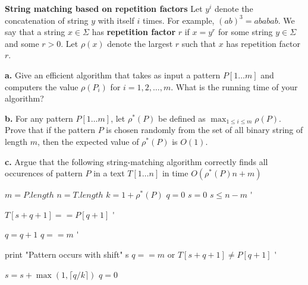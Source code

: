 \textbf{String matching based on repetition factors}
Let $y^i$ denote the concatenation of string $y$ with itself $i$ times. For example,
$(ab)^3 = ababab$. We say that a string $x\in \Sigma$ has \textbf{repetition factor}
$r$ if $x = y^r$ for some string $y\in \Sigma$ and some $r > 0$. Let $\rho(x)$ denote 
the largest $r$ such that $x$ has repetition factor $r$.

\textbf{a.} Give an efficient algorithm that takes as input a pattern $P[1\ldots m]$ and
computers the value $\rho(P_i)$ for $i = 1,2,\ldots,m$. What is the running time of your 
algorithm?

\textbf{b.} For any pattern $P[1\ldots m]$, let $\rho^*(P)$ be defined as $\max_{1\le i\le m}\rho(P)$.
Prove that if the pattern $P$ is chosen randomly from the set of all binary string of 
length $m$, then the expected value of $\rho^*(P)$ is $O(1)$.

\textbf{c.} Argue that the following string-matching algorithm correctly finds all 
occurences of pattern $P$ in a text $T[1\ldots n]$ in time $O(\rho^*(P)n+m)$

\newcommand{\Doo}{\>\textbf{}\hspace*{-0.7em}\'\addtocounter{indent}{1}}

\begin{codebox}
    \li $m = P.length$
    \li $n = T.length$
    \li $k = 1 + \rho^*(P)$
    \li $q = 0$
    \li $s = 0$
    \li \While $s \le n - m$
        \Doo 
    \li     \If $T[s + q + 1] == P[q + 1]$
            \Doo
    \li         $q = q + 1$
    \li         \If $q == m$
                \Doo
    \li             print "Pattern occurs with shift" s \End\End
    \li     \If $q == m$ or $T[s + q + 1] \neq P[q + 1]$
            \Doo
    \li         $s = s + \max(1, \lceil q / k\rceil)$
    \li         $q = 0$
\end{codebox}